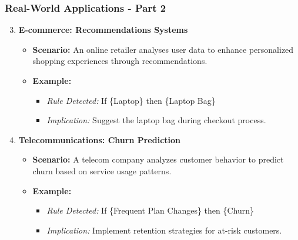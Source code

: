 \documentclass[aspectratio=169]{beamer}
\begin{document}
\begin{frame}[fragile]
    \frametitle{Real-World Applications - Part 2}
    \begin{enumerate}
        \setcounter{enumi}{2} %
        \item \textbf{E-commerce: Recommendations Systems}
            \begin{itemize}
                \item \textbf{Scenario:} An online retailer analyses user data to enhance personalized shopping experiences through recommendations.
                \item \textbf{Example:}
                    \begin{itemize}
                        \item \textit{Rule Detected:} If \{Laptop\} then \{Laptop Bag\}
                        \item \textit{Implication:} Suggest the laptop bag during checkout process.
                    \end{itemize}
            \end{itemize}
            
        \item \textbf{Telecommunications: Churn Prediction}
            \begin{itemize}
                \item \textbf{Scenario:} A telecom company analyzes customer behavior to predict churn based on service usage patterns.
                \item \textbf{Example:}
                    \begin{itemize}
                        \item \textit{Rule Detected:} If \{Frequent Plan Changes\} then \{Churn\}
                        \item \textit{Implication:} Implement retention strategies for at-risk customers.
                    \end{itemize}
            \end{itemize}
    \end{enumerate}
\end{frame}
\end{document}
